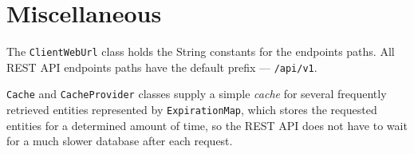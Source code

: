 \section{Miscellaneous}
The \texttt{ClientWebUrl} class holds the String constants for the endpoints paths. All REST API endpoints paths have the default prefix --- \texttt{/api/v1}.

\texttt{Cache} and \texttt{CacheProvider} classes supply a simple \emph{cache} for several frequently retrieved entities represented by \texttt{ExpirationMap}, which stores the requested entities for a determined amount of time, so the REST API does not have to wait for a much slower database after each request.
